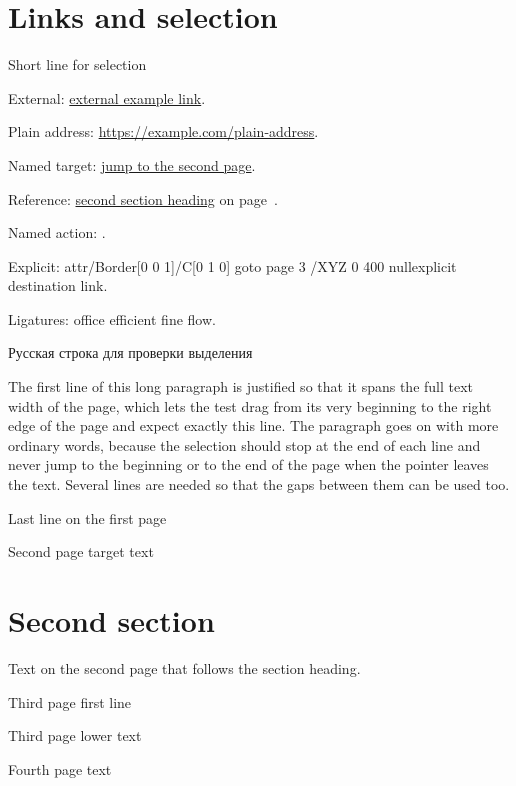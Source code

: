 \documentclass[a4paper,12pt]{article}
\begin{document}
\section{Links and selection}\label{sec:first}

\noindent Short line for selection

\noindent External: \href{https://example.com/labkeeper-pdf-link}{external example link}.

\noindent Plain address: \url{https://example.com/plain-address}.

\noindent Named target: \hyperlink{secondtarget}{jump to the second page}.

\noindent Reference: \hyperref[sec:second]{second section heading} on page~\pageref{sec:second}.

\noindent Named action: .

\noindent Explicit: \pdfstartlink attr{/Border[0 0 1]/C[0 1 0]} goto page 3 {/XYZ 0 400 null}explicit destination link\pdfendlink.

\noindent Ligatures: office efficient fine flow.\par


\noindent{}Русская строка для проверки выделения

The first line of this long paragraph is justified so that it spans the full text width of the page, which lets the test drag from its very beginning to the right edge of the page and expect exactly this line. The paragraph goes on with more ordinary words, because the selection should stop at the end of each line and never jump to the beginning or to the end of the page when the pointer leaves the text. Several lines are needed so that the gaps between them can be used too.

\vspace{2cm}

\noindent Last line on the first page

\newpage
\hypertarget{secondtarget}{Second page target text}

\section{Second section}\label{sec:second}

Text on the second page that follows the section heading.

\newpage
\noindent Third page first line

\vspace*{10cm}

\noindent Third page lower text

\newpage
\noindent Fourth page text
\end{document}
